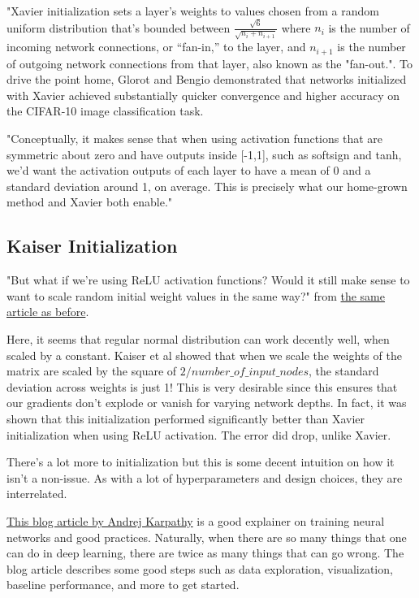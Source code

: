 "Xavier initialization sets a layer’s weights to values chosen from a random uniform distribution that’s bounded between $\frac{\sqrt{6}}{\sqrt{n_i + n_{i+1}}}$ where $n_i$ is the number of incoming network connections, or “fan-in,” to the layer, and $n_{i+1}$ is the number of outgoing network connections from that layer, also known as the "fan-out.". To drive the point home, Glorot and Bengio demonstrated that networks initialized with Xavier achieved substantially quicker convergence and higher accuracy on the CIFAR-10 image classification task.

"Conceptually, it makes sense that when using activation functions that are symmetric about zero and have outputs inside [-1,1], such as softsign and tanh, we’d want the activation outputs of each layer to have a mean of 0 and a standard deviation around 1, on average. This is precisely what our home-grown method and Xavier both enable."

\subsection{Kaiser Initialization}

"But what if we’re using ReLU activation functions? Would it still make sense to want to scale random initial weight values in the same way?" from \href{https://towardsdatascience.com/weight-initialization-in-neural-networks-a-journey-from-the-basics-to-kaiming-954fb9b47c79}{the same article as before}.

Here, it seems that regular normal distribution can work decently well, when scaled by a constant. Kaiser et al showed that when we scale the weights of the matrix are scaled by the square of $2/number\_of\_input\_nodes$, the standard deviation across weights is just 1! This is very desirable since this ensures that our gradients don't explode or vanish for varying network depths. In fact, it was shown that this initialization performed significantly better than Xavier initialization when using ReLU activation. The error did drop, unlike Xavier.

There's a lot more to initialization but this is some decent intuition on how it isn't a non-issue. As with a lot of hyperparameters and design choices, they are interrelated.

\href{http://karpathy.github.io/2019/04/25/recipe/}{This blog article by Andrej Karpathy} is a good explainer on training neural networks and good practices. Naturally, when there are so many things that one can do in deep learning, there are twice as many things that can go wrong. The blog article describes some good steps such as data exploration, visualization, baseline performance, and more to get started.

